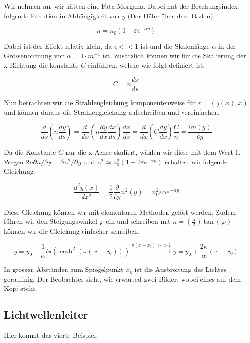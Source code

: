 Wir nehmen an, wir hätten eine Fata Morgana. 
Dabei hat der Brechungsindex folgende Funktion in Abhängigkeit von $y$ 
(Der Höhe über dem Boden).

\[
n = n_0 (1 - \varepsilon e^{- \alpha y})
\]

Dabei ist der Effekt relativ klein, da $\epsilon << 1$ ist und 
die Skalenlänge $\alpha$ in der Grössenordnung von $\alpha = 1 \cdot m^{-1}$ ist.
Zusätzlich können wir für die Skalierung der x-Richtung die konstante $C$ einführen,
welche wie folgt definiert ist:

\[
C = n \frac{dx}{ds}
\]

Nun betrachten wir die Strahlengleichung komponentenweise für $r = (y(x), x)$ 
und können daraus die Strahlengleichung aufschreiben und vereinfachen.

\[
\frac{d}{ds} \left ( n \frac{dy}{ds} \right ) =
\frac{d}{dx} \left ( n \frac{dy}{dx} \frac{dx}{ds} \right ) \frac{dx}{ds} =
\frac{d}{dx} \left ( C \frac{dy}{dx} \right ) \frac{C}{n} =
\frac{\partial n(y)}{\partial y}
\]

Da die Konstante $C$ nur die x-Achse skaliert, wählen wir diese mit dem Wert $1$.
Wegen $2 n \partial n / \partial y = \partial n^2 / \partial y$ und 
$n^2 \simeq n_0^2(1 - 2 \varepsilon e^{-\alpha y})$ erhalten wir folgende Gleichung.

\[
\frac{d^2 y(x)}{dx^2} =
\frac{1}{2} \frac{\partial}{\partial y} n^2(y) =
n_0^2 \varepsilon \alpha e^{-\alpha y}
\]

Diese Gleichung können wir mit elementaren Methoden gelöst werden. 
Zudem führen wir den Steigungswinkel $\varphi$ ein und schreiben mit 
$\kappa = (\frac{\alpha}{2}) \tan(\varphi)$ können wir die Gleichung einfacher schreiben.

\[
y =
y_0 + \frac{1}{\alpha} ln(\cosh^2(\kappa(x - x_0))) \xrightarrow{\kappa (x - x_0 ) >> 1}
y =
y_0 + \frac{2 \kappa}{\alpha} (x - x_0)
\]

In grossen Abständen zum Spiegelpunkt $x_0$ ist die Ausbreitung des Lichtes geradlinig.
Der Beobachter sieht, wie erwarted zwei Bilder, wobei eines auf dem Kopf steht.

\subsection{Lichtwellenleiter}

Hier kommt das vierte Beispiel.